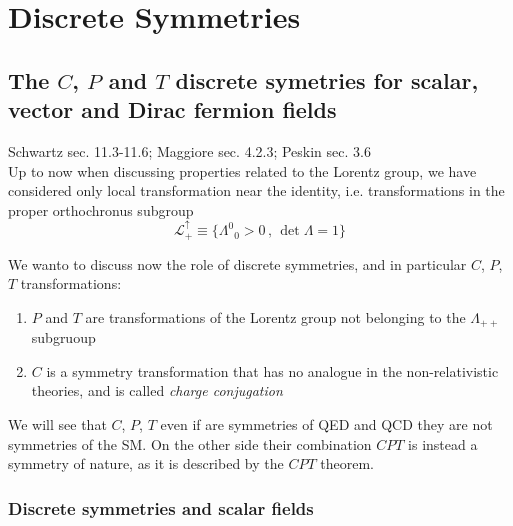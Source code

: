 \documentclass[TheoreticalPhy_ModB.tex]{subfiles}
\begin{document}
\newcommand{\lag}{\mathcal L}
\newcommand{\pde}[1]{\partial_{#1}}
\newcommand{\ipde}[1]{\partial^{#1}}
\newcommand{\mn}{{\mu\nu}}
\newcommand{\lr}{{L,R}}
\newcommand{\mcu}{\mathcal U}
\newcommand{\mcv}{\mathcal V}
\newcommand{\ckm}{V_{\text{CKM}}}
\newcommand{\pmns}{V_{\text{PMNS}}}
\newcommand{\upmns}{U_{\text{PMNS}}}
\newcommand{\sendC}{\overset{C}{\to}}
\newcommand{\sendP}{\overset{P}{\to}}
\newcommand{\sendT}{\overset{T}{\to}}
\newcommand{\sendCPT}{\overset{CPT}{\to}}
\newcommand{\parity}{\mathcal P}
\newcommand{\timerev}{\mathcal T}
\newcommand{\charge}{\mathcal C}



\chapter{Discrete Symmetries}

\section{The $C$, $P$ and $T$ discrete symetries for scalar, vector and Dirac fermion fields}

\textsf{Schwartz sec. 11.3-11.6; Maggiore sec. 4.2.3; Peskin sec. 3.6}\\

Up to now when discussing properties related to the Lorentz group, we have considered only local transformation near the identity, i.e. transformations in the proper orthochronus subgroup 
\[\lag_+^\uparrow\equiv\{{\Lambda^0}_0>0\,,\,\det\Lambda=1\}\]

We wanto to discuss now the role of discrete symmetries, and in particular $C$, $P$, $T$ transformations:
\begin{enumerate}[label=\textbullet]
\item $P$ and $T$ are transformations of the Lorentz group not belonging to the $\Lambda_{++}$ subgruoup
\item $C$ is a symmetry transformation that has no analogue in the non-relativistic theories, and is called \emph{charge conjugation}
\end{enumerate}

We will see that $C$, $P$, $T$ even if are symmetries of QED and QCD they are not symmetries of the SM. On the other side their combination $CPT$ is instead a symmetry of nature, as it is described by the $CPT$ theorem. 

\subsection{Discrete symmetries and scalar fields}
\end{document}
